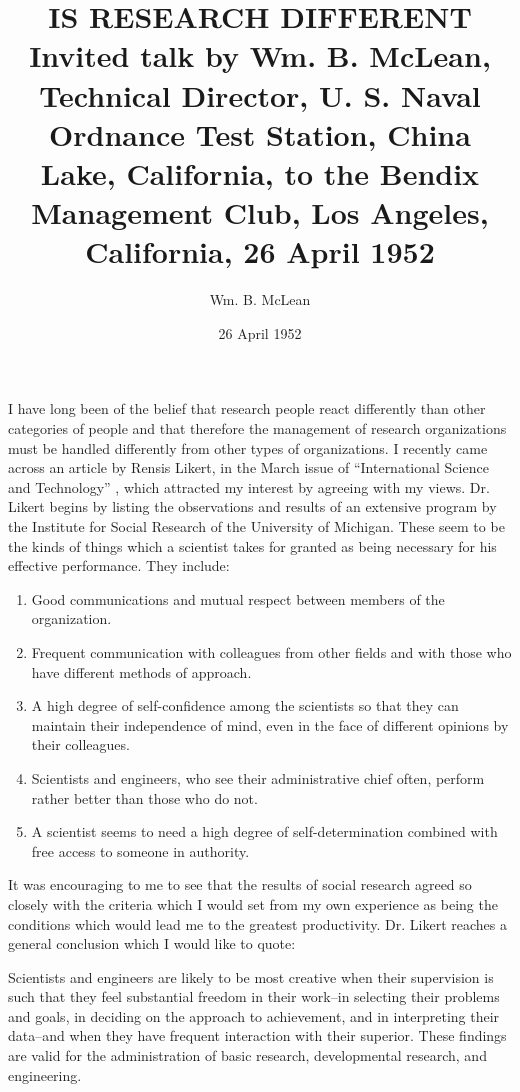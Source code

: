 \documentclass{article}
\title{%
  IS RESEARCH DIFFERENT \\
  \large Invited talk by Wm. B. McLean, Technical Director, U. S. Naval Ordnance Test Station, China Lake, California, to the Bendix Management Club, Los Angeles, California, 26 April 1952
}
\author{Wm. B. McLean}
\date{26 April 1952}
\begin{document}
\maketitle

I have long been of the belief that research people react differently than other categories of people and that therefore the management of research organizations must be handled differently from other types of organizations. I recently came across an article by Rensis Likert, in the March issue of ``International Science and Technology'' \cite{likert}, which attracted my interest by agreeing with my views. Dr. Likert begins by listing the observations and results of an extensive program by the Institute for Social Research of the University of Michigan. These seem to be the kinds of things which a scientist takes for granted as being necessary for his effective performance. They include:

\begin{enumerate}
  \item Good communications and mutual respect between members of the organization.
  \item Frequent communication with colleagues from other fields and with those who have different methods of approach.
  \item A high degree of self-confidence among the scientists so that they can maintain their independence of mind, even in the face of different opinions by their colleagues.
  \item Scientists and engineers, who see their administrative chief often, perform rather better than those who do not. 
  \item A scientist seems to need a high degree of self-determination combined with free access to someone in authority. 
\end{enumerate}

It was encouraging to me to see that the results of social research agreed so closely with the criteria which I would set from my own experience as being the conditions which would lead me to the greatest productivity. Dr. Likert reaches a general conclusion which I would like to quote:

\begin{displayquote}
Scientists and engineers are likely to be most creative when their supervision is such that they feel substantial freedom in their work--in selecting their problems and goals, in deciding on the approach to achievement, and in interpreting their data--and when they have frequent interaction with their superior. These findings are valid for the administration of basic research, developmental research, and engineering.
\end{displayquote}
\end{document}
